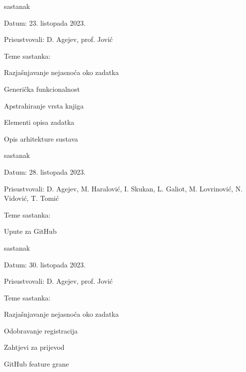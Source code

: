 \begin{packed_enum}
			\item  sastanak
			\item[] \begin{packed_item}
				\item Datum: 23. listopada 2023.
				\item Prisustvovali:  D. Agejev, prof. Jović
				\item Teme sastanka:
				\begin{packed_item}
					\item  Razjašnjavanje nejasnoća oko zadatka
					\begin{packed_item}
						\item  Generička funkcionalnost
						\item  Apstrahiranje vrsta knjiga
						\item  Elementi opisa zadatka
						\item  Opis arhitekture sustava
					\end{packed_item}
				\end{packed_item}
			\end{packed_item}
			
			\item  sastanak
			\item[] \begin{packed_item}
				\item Datum: 28. listopada 2023.
				\item Prisustvovali:  D. Agejev, M. Haralović, I. Skukan, L. Galiot, M. Lovrinović, N. Vidović, T. Tomić
				\item Teme sastanka:
				\begin{packed_item}
					\item  Upute za GitHub
				\end{packed_item}
			\end{packed_item}
			
			\item  sastanak
			\item[] \begin{packed_item}
				\item Datum: 30. listopada 2023.
				\item Prisustvovali:  D. Agejev, prof. Jović
				\item Teme sastanka:
				\begin{packed_item}
					\item  Razjašnjavanje nejasnoća oko zadatka
					\begin{packed_item}
						\item  Odobravanje registracija
						\item  Zahtjevi za prijevod
						\item  GitHub feature grane
					\end{packed_item}
				\end{packed_item}
			\end{packed_item}
			

\end{packed_enum}
